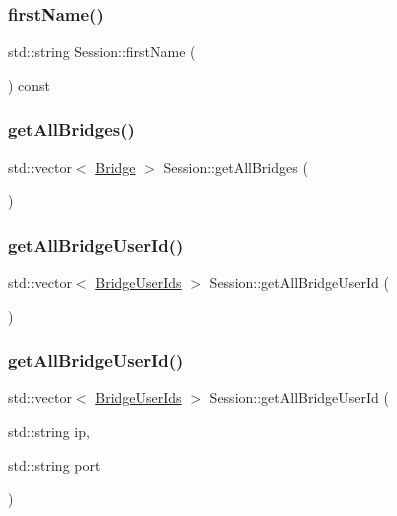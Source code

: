 \subsubsection{\texorpdfstring{first\+Name()}{firstName()}}
{\footnotesize\ttfamily std\+::string Session\+::first\+Name (\begin{DoxyParamCaption}{ }\end{DoxyParamCaption}) const}

\mbox{\label{class_session_aecaecc666ef5e3344420b36e40d5b0cc}} 
\subsubsection{\texorpdfstring{get\+All\+Bridges()}{getAllBridges()}}
{\footnotesize\ttfamily std\+::vector$<$ \hyperlink{class_bridge}{Bridge} $>$ Session\+::get\+All\+Bridges (\begin{DoxyParamCaption}{ }\end{DoxyParamCaption})}

\mbox{\label{class_session_a38d17c83c95082958506a5879eff7c93}} 
\subsubsection{\texorpdfstring{get\+All\+Bridge\+User\+Id()}{getAllBridgeUserId()}\hspace{0.1cm}{\footnotesize\ttfamily [1/3]}}
{\footnotesize\ttfamily std\+::vector$<$ \hyperlink{class_bridge_user_ids}{Bridge\+User\+Ids} $>$ Session\+::get\+All\+Bridge\+User\+Id (\begin{DoxyParamCaption}{ }\end{DoxyParamCaption})}

\mbox{\label{class_session_a0c60934144d2e92258c33f3560642293}} 
\subsubsection{\texorpdfstring{get\+All\+Bridge\+User\+Id()}{getAllBridgeUserId()}\hspace{0.1cm}{\footnotesize\ttfamily [2/3]}}
{\footnotesize\ttfamily std\+::vector$<$ \hyperlink{class_bridge_user_ids}{Bridge\+User\+Ids} $>$ Session\+::get\+All\+Bridge\+User\+Id (\begin{DoxyParamCaption}\item[{std\+::string}]{ip,  }\item[{std\+::string}]{port }\end{DoxyParamCaption})}

